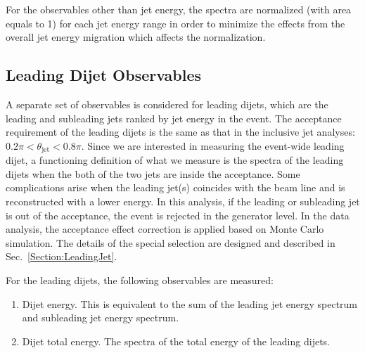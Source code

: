 For the observables other than jet energy, the spectra are normalized (with area equals to 1) for each jet energy range in order to minimize the effects from the overall jet energy migration which affects the normalization.

\subsection{Leading Dijet Observables}

A separate set of observables is considered for leading dijets, which are the leading and subleading jets ranked by jet energy in the event.  The acceptance requirement of the leading dijets is the same as that in the inclusive jet analyses: $0.2\pi < \theta_\text{jet} < 0.8\pi$.  Since we are interested in measuring the event-wide leading dijet, a functioning definition of what we measure is the spectra of the leading dijets when the both of the two jets are inside the acceptance. Some complications arise when the leading jet(s) coincides with the beam line and is reconstructed with a lower energy. In this analysis, if the leading or subleading jet is out of the acceptance, the event is rejected in the generator level. In the data analysis, the acceptance effect correction is applied based on Monte Carlo simulation. The details of the special selection are designed and described in Sec.~\ref{Section:LeadingJet}.

For the leading dijets, the following observables are measured:
%
\begin{enumerate}
    \item Dijet energy.  This is equivalent to the sum of the leading jet energy spectrum and subleading jet energy spectrum. 
    \item Dijet total energy.  The spectra of the total energy of the leading dijets.
\end{enumerate}



\clearpage